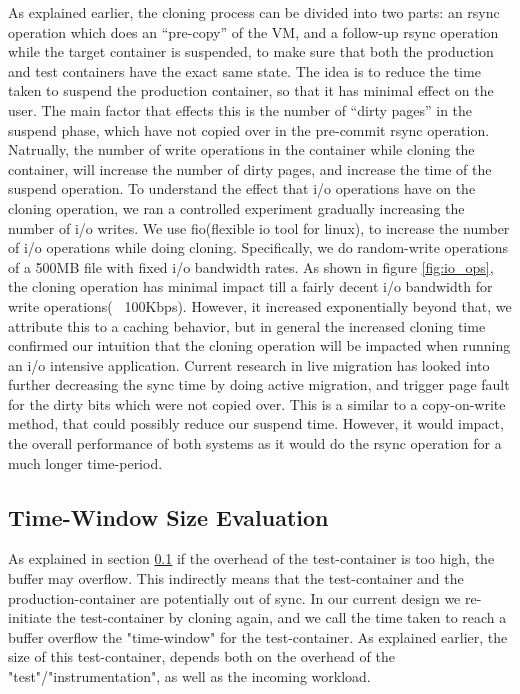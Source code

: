 As explained earlier, the cloning process can be divided into two parts: an rsync operation which does an ``pre-copy'' of the VM, and a follow-up rsync operation while the target container is suspended, to make sure that both the production and test containers have the exact same state.
The idea is to reduce the time taken to suspend the production container, so that it has minimal effect on the user.
The main factor that effects this is the number of ``dirty pages'' in the suspend phase, which have not copied over in the pre-commit rsync operation.
Natrually, the number of write operations in the container while cloning the container, will increase the number of dirty pages, and increase the time of the suspend operation.
To understand the effect that i/o operations have on the cloning operation, we ran a controlled experiment gradually increasing the number of i/o writes. 
We use fio(flexible io tool for linux)\cite{fio}, to increase the number of i/o operations while doing cloning. 
Specifically, we do random-write operations of a 500MB file with fixed i/o bandwidth rates.
As shown in figure \ref{fig:io_ops}, the cloning operation has minimal impact till a fairly decent i/o bandwidth for write operations(~ 100Kbps). 
However, it increased exponentially beyond that, we attribute this to a caching behavior, but in general the increased cloning time confirmed our intuition that the cloning operation will be impacted when running an i/o intensive application.
Current research in live migration has looked into further decreasing the sync time by doing active migration, and trigger page fault for the dirty bits which were not copied over.
This is a similar to a copy-on-write method, that could possibly reduce our suspend time.
However, it would impact, the overall performance of both systems as it would do the rsync operation for a much longer time-period.

\subsection{Time-Window Size Evaluation}
\label{sec:timewindowPerformance}

As explained in section \ref{sec:timewindowPerformance} if the overhead of the test-container is too high, the buffer may overflow.
This indirectly means that the test-container and the production-container are potentially out of sync.
In our current design we re-initiate the test-container by cloning again, and we call the time taken to reach a buffer overflow the "time-window" for the test-container.
As explained earlier, the size of this test-container, depends both on the overhead of the "test"/"instrumentation", as well as the incoming workload.


